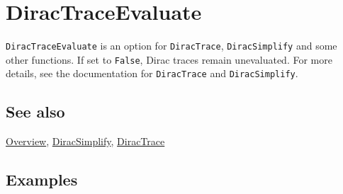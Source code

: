 \documentclass[../FeynCalcManual.tex]{subfiles}
\begin{document}
\hypertarget{diractraceevaluate}{%
\section{DiracTraceEvaluate}\label{diractraceevaluate}}

\texttt{DiracTraceEvaluate} is an option for \texttt{DiracTrace},
\texttt{DiracSimplify} and some other functions. If set to
\texttt{False}, Dirac traces remain unevaluated. For more details, see
the documentation for \texttt{DiracTrace} and \texttt{DiracSimplify}.

\subsection{See also}

\hyperlink{toc}{Overview}, \hyperlink{diracsimplify}{DiracSimplify},
\hyperlink{diractrace}{DiracTrace}

\subsection{Examples}
\end{document}
